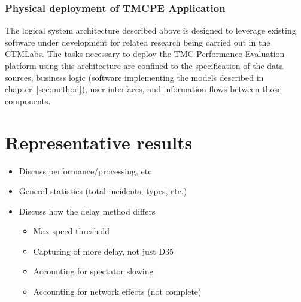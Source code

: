 \documentclass[12pt]{report}
\begin{document}
\subsection{Physical deployment of TMCPE Application}
\label{sec:arch}

The logical system architecture described above is designed to
leverage existing software under development for related research
being carried out in the \ac{CTMLabs}.  The tasks necessary to deploy the
\ac{TMC} Performance Evaluation platform using this architecture are
confined to the specification of the data sources, business logic
(software implementing the models described in
chapter~\ref{sec:method}), user interfaces, and information flows
between those components.







\chapter{Representative results}
\label{chap:results}

\begin{itemize}
\item Discuss performance/processing, etc
\item General statistics (total incidents, types, etc.)
\item Discuss how the delay method differs
  \begin{itemize}
  \item Max speed threshold
  \item Capturing of more delay, not just D35
  \item Accounting for spectator slowing
  \item Accounting for network effects (not complete)
  \end{itemize}
\end{itemize}
\end{document}
